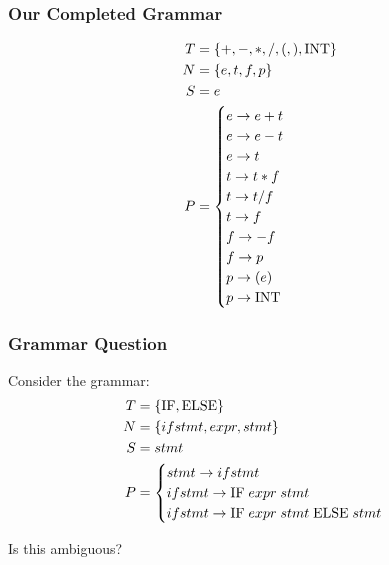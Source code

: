 \documentclass[aspectratio=169]{beamer}
\begin{document}
\begin{frame}
\frametitle{Our Completed Grammar}

\small
\begin{align*}
T &= \{ +, -, *, /, (, ), \text{\lstinline{INT}} \}\\
N &= \{ e, t, f, p \}\\
S &= e\\
P &= \begin{cases}e \rightarrow e + t\\
     e \rightarrow e - t\\
     e \rightarrow t\\
     t \rightarrow t * f\\
     t \rightarrow t / f\\
     t \rightarrow f\\
     f \rightarrow - f\\
     f \rightarrow p\\
     p \rightarrow ( e )\\
     p \rightarrow \text{\lstinline{INT}}\end{cases}
\end{align*}
\end{frame}

\begin{frame}
\frametitle{Grammar Question}

Consider the grammar:
\begin{align*}
T &= \{ \text{\lstinline{IF}}, \text{\lstinline{ELSE}} \}\\
N &= \{ ifstmt, expr, stmt \}\\
S &= stmt\\
P &= \begin{cases}stmt \rightarrow ifstmt\\
     ifstmt \rightarrow \text{\lstinline{IF}} \; expr \; stmt\\
     ifstmt \rightarrow \text{\lstinline{IF}} \; expr \; stmt \;
                        \text{\lstinline{ELSE}} \; stmt\end{cases}
\end{align*}

Is this ambiguous?
\end{frame}
\end{document}
